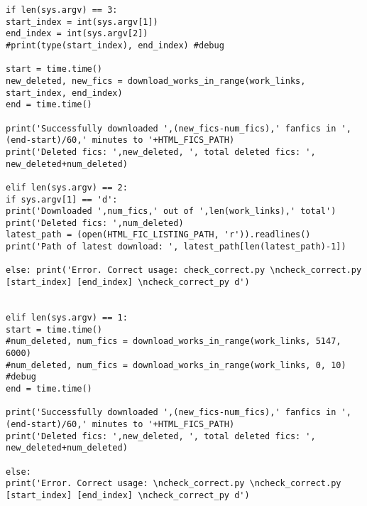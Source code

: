 \documentclass{pre-tfg}
\begin{document}
\begin{lstlisting}[style=consola]
if len(sys.argv) == 3:
start_index = int(sys.argv[1])
end_index = int(sys.argv[2])
#print(type(start_index), end_index) #debug

start = time.time()
new_deleted, new_fics = download_works_in_range(work_links, start_index, end_index)
end = time.time()

print('Successfully downloaded ',(new_fics-num_fics),' fanfics in ',(end-start)/60,' minutes to '+HTML_FICS_PATH)
print('Deleted fics: ',new_deleted, ', total deleted fics: ', new_deleted+num_deleted)

elif len(sys.argv) == 2:
if sys.argv[1] == 'd':
print('Downloaded ',num_fics,' out of ',len(work_links),' total')
print('Deleted fics: ',num_deleted)
latest_path = (open(HTML_FIC_LISTING_PATH, 'r')).readlines()
print('Path of latest download: ', latest_path[len(latest_path)-1])

else: print('Error. Correct usage: check_correct.py \ncheck_correct.py [start_index] [end_index] \ncheck_correct_py d')


elif len(sys.argv) == 1:	
start = time.time()
#num_deleted, num_fics = download_works_in_range(work_links, 5147, 6000)
#num_deleted, num_fics = download_works_in_range(work_links, 0, 10) #debug
end = time.time()

print('Successfully downloaded ',(new_fics-num_fics),' fanfics in ',(end-start)/60,' minutes to '+HTML_FICS_PATH)
print('Deleted fics: ',new_deleted, ', total deleted fics: ', new_deleted+num_deleted)

else:
print('Error. Correct usage: \ncheck_correct.py \ncheck_correct.py [start_index] [end_index] \ncheck_correct_py d')

\end{lstlisting}

\cleardoublepage
\end{document}
